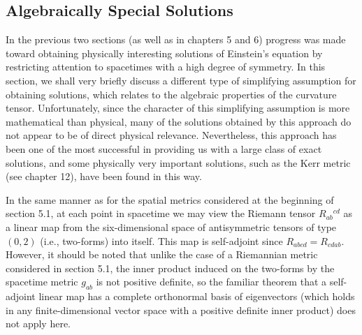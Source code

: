 
\subsection{Algebraically Special Solutions}\label{sec:7.3}

In the previous two sections (as well as in chapters 5 and 6) progress was made
toward obtaining physically interesting solutions of Einstein's equation by
restricting attention to spacetimes with a high degree of symmetry. In this section,
we shall very briefly discuss a different type of simplifying assumption for obtaining
solutions, which relates to the algebraic properties of the curvature tensor.
Unfortunately, since the character of this simplifying assumption is more
mathematical than physical, many of the solutions obtained by this approach do not
appear to be of direct physical relevance. Nevertheless, this approach has been one
of the most successful in providing us with a large class of exact solutions, and some
physically very important solutions, such as the Kerr metric (see chapter 12), have
been found in this way.

In the same manner as for the spatial metrics considered at the beginning of
section 5.1, at each point in spacetime we may view the Riemann tensor
\(R_{ab}{}^{cd}\) as a linear map from the six-dimensional space of antisymmetric
tensors of type \((0,2)\) (i.e., two-forms) into itself. This map is self-adjoint since
\(R_{abcd}=R_{cdab}\). However, it should be noted that unlike the case of a
Riemannian metric considered in section 5.1, the inner product induced on the
two-forms by the spacetime metric \(g_{ab}\) is not positive definite, so the familiar
theorem that a self-adjoint linear map has a complete orthonormal basis of
eigenvectors (which holds in any finite-dimensional vector space with a positive
definite inner product) does not apply here.


